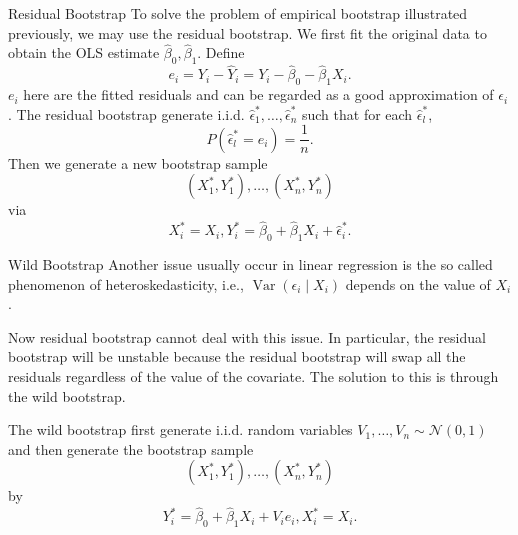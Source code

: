 \documentclass[
  ignorenonframetext,
]{beamer}
\begin{document}
\begin{frame}{Residual Bootstrap}
\protect{}\label{residual-bootstrap}
To solve the problem of empirical bootstrap illustrated previously, we
may use the residual bootstrap. We first fit the original data to obtain
the OLS estimate \(\hat{\beta}_0, \hat{\beta}_1\). Define \[
e_i=Y_i-\hat{Y}_i=Y_i-\hat{\beta}_0-\hat{\beta}_1 X_i .
\] \(e_i\) here are the fitted residuals and can be regarded as a good
approximation of \(\epsilon_i\). The residual bootstrap generate i.i.d.
\(\hat{\epsilon}_1^*, \ldots, \hat{\epsilon}_n^*\) such that for each
\(\hat{\epsilon}_l^*\), \[
P\left(\hat{\epsilon}_l^*=e_i\right)=\frac{1}{n} .
\] Then we generate a new bootstrap sample \[
\left(X_1^*, Y_1^*\right), \ldots,\left(X_n^*, Y_n^*\right)
\] via \[
X_i^*=X_i, Y_i^*=\hat{\beta}_0+\hat{\beta}_1 X_i+\hat{\epsilon}_i^* .
\]
\end{frame}

\begin{frame}{Wild Bootstrap}
\protect{}\label{wild-bootstrap}
Another issue usually occur in linear regression is the so called
phenomenon of heteroskedasticity, i.e.,
\(\operatorname{Var}\left(\epsilon_i \mid X_i\right)\) depends on the
value of \(X_i\).

Now residual bootstrap cannot deal with this issue. In particular, the
residual bootstrap will be unstable because the residual bootstrap will
swap all the residuals regardless of the value of the covariate. The
solution to this is through the wild bootstrap.

The wild bootstrap first generate i.i.d. random variables
\(V_1, \ldots, V_n \sim \mathcal{N}(0,1)\) and then generate the
bootstrap sample \[
\left(X_1^*, Y_1^*\right), \ldots,\left(X_n^*, Y_n^*\right)
\] by \[
Y_i^*=\hat{\beta}_0+\hat{\beta}_1 X_i+V_i e_i, X_i^*=X_i .
\]
\end{frame}
\end{document}
